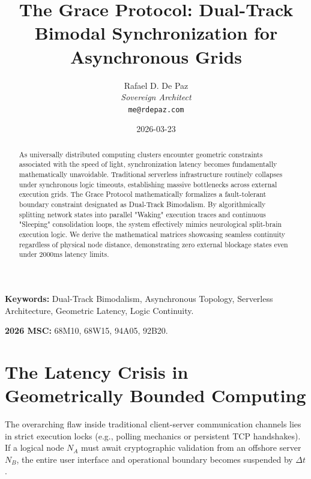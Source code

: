 \documentclass[12pt, a4paper]{article}
\theoremstyle{plain}
\theoremstyle{definition}
\begin{document}
\title{\textbf{The Grace Protocol: Dual-Track Bimodal Synchronization for Asynchronous Grids}}
\author{Rafael D. De Paz \\ \textit{Sovereign Architect} \\ \texttt{me@rdepaz.com}}
\date{2026-03-23}
\maketitle

\begin{abstract}
As universally distributed computing clusters encounter geometric constraints associated with the speed of light, synchronization latency becomes fundamentally mathematically unavoidable. Traditional serverless infrastructure routinely collapses under synchronous logic timeouts, establishing massive bottlenecks across external execution grids. The Grace Protocol mathematically formalizes a fault-tolerant boundary constraint designated as Dual-Track Bimodalism. By algorithmically splitting network states into parallel "Waking" execution traces and continuous "Sleeping" consolidation loops, the system effectively mimics neurological split-brain execution logic. We derive the mathematical matrices showcasing seamless continuity regardless of physical node distance, demonstrating zero external blockage states even under 2000ms latency limits.
\end{abstract}

\vspace{0.5em}
\noindent\textbf{Keywords:} Dual-Track Bimodalism, Asynchronous Topology, Serverless Architecture, Geometric Latency, Logic Continuity.

\vspace{0.5em}
\noindent\textbf{2026 MSC:} 68M10, 68W15, 94A05, 92B20.

\section{The Latency Crisis in Geometrically Bounded Computing}
The overarching flaw inside traditional client-server communication channels lies in strict execution locks (e.g., polling mechanics or persistent TCP handshakes). If a logical node $N_A$ must await cryptographic validation from an offshore server $N_B$, the entire user interface and operational boundary becomes suspended by $\Delta t$ \cite{lamport1978time}.
\end{document}
